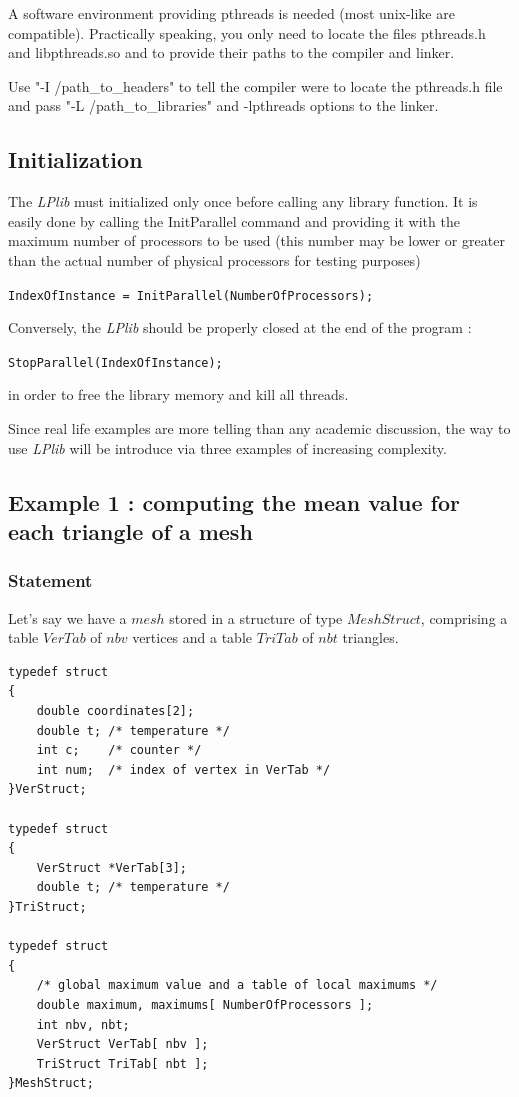 \documentclass[a4paper,12pt]{article}
\begin{document}
A software environment providing pthreads is needed (most unix-like are compatible). Practically speaking, you only need to locate the files pthreads.h and libpthreads.so and to provide their paths to the compiler and linker.

Use "-I /path\_to\_headers" to tell the compiler were to locate the pthreads.h file and pass "-L /path\_to\_libraries" and -lpthreads options to the linker.


\subsection{Initialization}

The \emph{LPlib} must initialized only once before calling any library function. It is easily done by calling the InitParallel command and providing it with the maximum number of processors to be used (this number may be lower or greater than the actual number of physical processors for testing purposes)

\medskip
\tt{IndexOfInstance = InitParallel(NumberOfProcessors);}
\normalfont
\medskip

\noindent Conversely, the \emph{LPlib} should be properly closed at the end of the program :

\medskip
\tt{StopParallel(IndexOfInstance);}
\normalfont
\medskip

\noindent in order to free the library memory and kill all threads.

Since real life examples are more telling than any academic discussion, the way to use \emph{LPlib} will be introduce via three examples of increasing complexity.

\subsection{Example 1 : computing the mean value for each triangle of a mesh}

\subsubsection{Statement}

Let's say we have a $mesh$ stored in a structure of type $MeshStruct$, comprising a table $VerTab$ of $nbv$ vertices and a table $TriTab$ of $nbt$ triangles.

\begin{tt}
\begin{verbatim}
typedef struct
{
    double coordinates[2];
    double t; /* temperature */
    int c;    /* counter */
    int num;  /* index of vertex in VerTab */
}VerStruct;

typedef struct
{
    VerStruct *VerTab[3];
    double t; /* temperature */
}TriStruct;

typedef struct
{
    /* global maximum value and a table of local maximums */
    double maximum, maximums[ NumberOfProcessors ];
    int nbv, nbt;
    VerStruct VerTab[ nbv ];
    TriStruct TriTab[ nbt ];
}MeshStruct;
\end{verbatim}
\end{tt}
\normalfont
\end{document}
